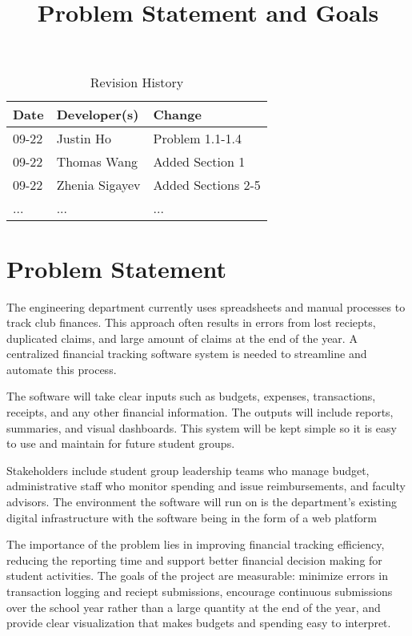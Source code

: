 \documentclass{article}
\title{Problem Statement and Goals\\\progname}
\author{\authname}
\date{}
\begin{document}
\maketitle

\begin{table}[hp]
\caption{Revision History} \label{TblRevisionHistory}
\begin{tabularx}{\textwidth}{llX}
\toprule
\textbf{Date} & \textbf{Developer(s)} & \textbf{Change}\\
\midrule
09-22 & Justin Ho& Problem 1.1-1.4\\
09-22 & Thomas Wang & Added Section 1\\
09-22 & Zhenia Sigayev & Added Sections 2-5\\
... & ... & ...\\
\bottomrule
\end{tabularx}
\end{table}

\section{Problem Statement}

The engineering department currently uses spreadsheets and manual processes to track club finances. This approach
often results in errors from lost reciepts, duplicated claims, and large amount of claims at the end of the year. A centralized
financial tracking software system is needed to streamline and automate this process.

The software will take clear inputs such as budgets, expenses, transactions, receipts, and any other financial
information. The outputs will include reports, summaries, and visual dashboards. This system will be kept simple
so it is easy to use and maintain for future student groups.

Stakeholders include student group leadership teams who manage budget, administrative staff who monitor spending and 
issue reimbursements, and faculty advisors. The environment the software will run on is the department's existing digital 
infrastructure with the software being in the form of a web platform

The importance of the problem lies in improving financial tracking efficiency, reducing the reporting time
and support better financial decision making for student activities. The goals of the project are measurable: minimize
errors in transaction logging and reciept submissions, encourage continuous submissions over the school year rather than 
a large quantity at the end of the year, and provide clear visualization that makes budgets and spending easy to interpret.
\end{document}
